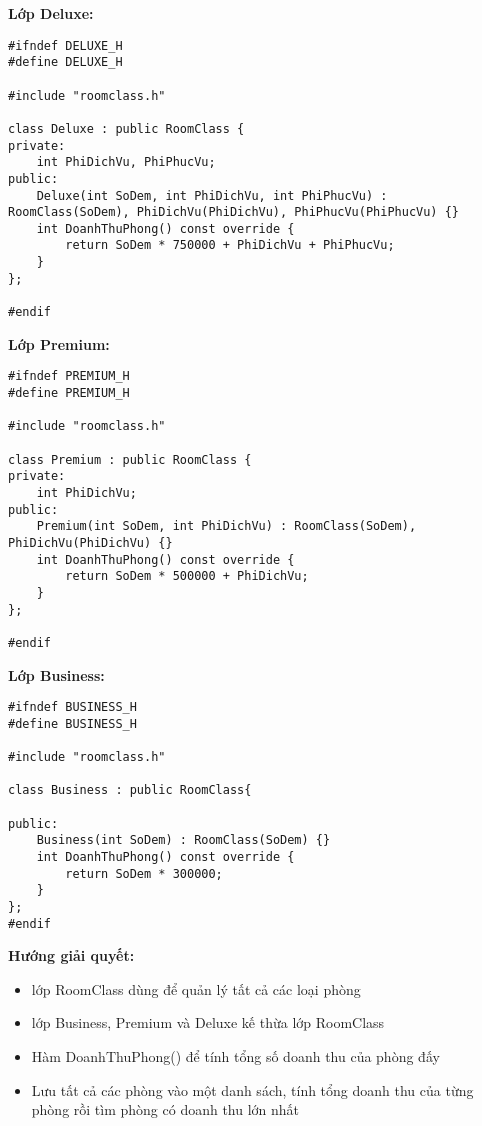 \item{\textbf{Lớp Deluxe: }}
\begin{verbatim}
#ifndef DELUXE_H
#define DELUXE_H

#include "roomclass.h"

class Deluxe : public RoomClass {
private: 
    int PhiDichVu, PhiPhucVu;
public: 
    Deluxe(int SoDem, int PhiDichVu, int PhiPhucVu) : RoomClass(SoDem), PhiDichVu(PhiDichVu), PhiPhucVu(PhiPhucVu) {}
    int DoanhThuPhong() const override {
        return SoDem * 750000 + PhiDichVu + PhiPhucVu;
    }
};

#endif
\end{verbatim}
\item{\textbf{Lớp Premium: }}
\begin{verbatim}
#ifndef PREMIUM_H
#define PREMIUM_H

#include "roomclass.h"

class Premium : public RoomClass {
private: 
    int PhiDichVu;
public:
    Premium(int SoDem, int PhiDichVu) : RoomClass(SoDem), PhiDichVu(PhiDichVu) {}
    int DoanhThuPhong() const override {
        return SoDem * 500000 + PhiDichVu;
    }
};

#endif 
\end{verbatim}
\item{\textbf{Lớp Business: }}
\begin{verbatim}
#ifndef BUSINESS_H
#define BUSINESS_H

#include "roomclass.h"

class Business : public RoomClass{

public: 
    Business(int SoDem) : RoomClass(SoDem) {}
    int DoanhThuPhong() const override {
        return SoDem * 300000;
    }
};
#endif 
\end{verbatim}
\item{\textbf{Hướng giải quyết:}}
\begin{itemize}
   \item lớp RoomClass dùng để quản lý tất cả các loại phòng
   \item lớp Business, Premium và Deluxe kế thừa lớp RoomClass
   \item Hàm DoanhThuPhong() để tính tổng số doanh thu của phòng đấy
   \item Lưu tất cả các phòng vào một danh sách, tính tổng doanh thu của từng phòng rồi tìm phòng có doanh thu lớn nhất
\end{itemize}

